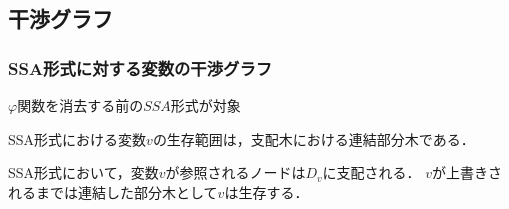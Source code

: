 \documentclass[ckj,dvipdfmx]{beamer}
\begin{document}
\subsection{干渉グラフ}

\begin{frame}
\frametitle{SSA形式に対する変数の干渉グラフ}
$\varphi$関数を消去する前の$SSA$形式が対象\\
\begin{Prop}
SSA形式における変数$v$の生存範囲は，支配木における連結部分木である．
\end{Prop}

SSA形式において，変数$v$が参照されるノードは$D_v$に支配される．
$v$が上書きされるまでは連結した部分木として$v$は生存する．

\end{frame}
\end{document}
